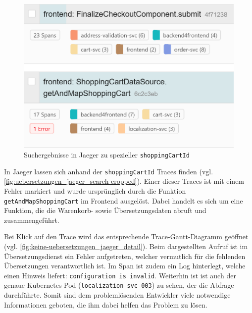 \begin{figure}
\centering
\includegraphics[width=\linewidth]{img/05_ergebnis/keine-uebersetzungen_jaeger_search-cropped.png}
\caption{Suchergebnisse in Jaeger zu spezieller \texttt{shoppingCartId}}
\label{fig:uebersetzungen_jaeger_search-cropped}
\end{figure}

In Jaeger lassen sich anhand der \texttt{shopping\-Cart\-Id} Traces finden (vgl. \autoref{fig:uebersetzungen_jaeger_search-cropped}). Einer dieser Traces ist mit einem Fehler markiert und wurde ursprünglich durch die Funktion \texttt{getAndMapShoppingCart} im Frontend ausgelöst. Dabei handelt es sich um eine Funktion, die die Warenkorb- sowie Übersetzungsdaten abruft und zusammengeführt.

Bei Klick auf den Trace wird das entsprechende Trace-Gantt-Diagramm geöffnet (vgl. \autoref{fig:keine-uebersetzungen_jaeger_detail}). Beim dargestellten Aufruf ist im Übersetzungsdienst ein Fehler aufgetreten, welcher vermutlich für die fehlenden Übersetzungen verantwortlich ist. Im Span ist zudem ein Log hinterlegt, welche einen Hinweis liefert: \texttt{configuration is invalid}. Weiterhin ist ist auch der genaue Kubernetes-Pod (\texttt{localization-svc-003}) zu sehen, der die Abfrage durchführte. Somit sind dem problemlösenden Entwickler viele notwendige Informationen geboten, die ihm dabei helfen das Problem zu lösen.

